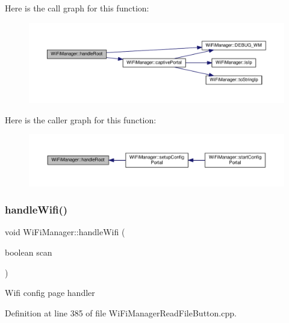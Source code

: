 Here is the call graph for this function\+:\nopagebreak
\begin{figure}[H]
\begin{center}
\leavevmode
\includegraphics[width=350pt]{class_wi_fi_manager_a47e4c7df7478f690c53ff9f5125c9760_cgraph}
\end{center}
\end{figure}
Here is the caller graph for this function\+:\nopagebreak
\begin{figure}[H]
\begin{center}
\leavevmode
\includegraphics[width=350pt]{class_wi_fi_manager_a47e4c7df7478f690c53ff9f5125c9760_icgraph}
\end{center}
\end{figure}
\mbox{\label{class_wi_fi_manager_a57a9048175c1918340ab9d0a2c53601f}} 
\subsubsection{\texorpdfstring{handle\+Wifi()}{handleWifi()}}
{\footnotesize\ttfamily void Wi\+Fi\+Manager\+::handle\+Wifi (\begin{DoxyParamCaption}\item[{boolean}]{scan }\end{DoxyParamCaption})\hspace{0.3cm}{\ttfamily [private]}}

Wifi config page handler 

Definition at line 385 of file Wi\+Fi\+Manager\+Read\+File\+Button.\+cpp.

